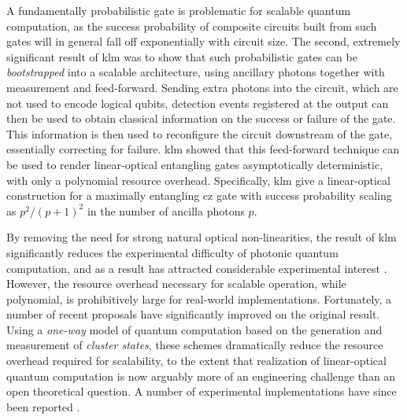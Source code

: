 A fundamentally probabilistic gate is problematic for scalable quantum computation, as the success probability of composite circuits built from such gates will in general fall off exponentially with circuit size. The second, extremely significant result of \gls{klm} was to show that such probabilistic gates can be \emph{bootstrapped} into a scalable architecture, using ancillary photons together with measurement and feed-forward. Sending extra photons into the circuit, which are not used to encode logical qubits, detection events registered at the output can then be used to obtain classical information on the success or failure of the gate. This information is then used to reconfigure the circuit downstream of the gate, essentially correcting for failure.  \gls{klm} showed that this feed-forward technique can be used to render linear-optical entangling gates asymptotically deterministic, with only a polynomial resource overhead. Specifically, \gls{klm} give a linear-optical construction for a maximally entangling \gls{cz} gate with success probability scaling as $p^2/(p+1)^2$ in the number of ancilla photons $p$.

By removing the need for strong natural optical non-linearities, the result of \gls{klm} significantly reduces the experimental difficulty of photonic quantum computation, and as a result has attracted considerable experimental interest \cite{OBrien2009, Gasparoni2004}. 
However, the resource overhead necessary for scalable operation, while polynomial, is prohibitively large for real-world implementations. Fortunately, a number of recent proposals \cite{Nielsen2004a, Browne2005} have significantly improved on the original result. Using a \emph{one-way} model of quantum computation based on the generation and measurement of \emph{cluster states}, these schemes dramatically reduce the resource overhead required for scalability, to the extent that realization of linear-optical quantum computation is now arguably more of an engineering challenge than an open theoretical question. A number of experimental implementations have since been reported \cite{Walther2005c, Prevedel2007, Ceccarelli2009}.

